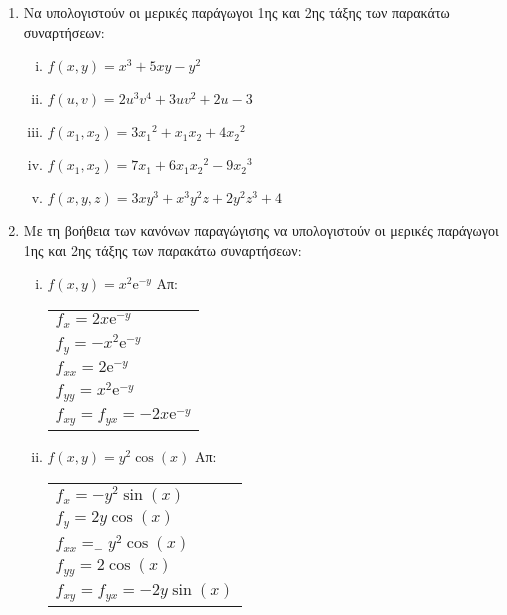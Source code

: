 \documentclass[a4paper,table]{report}
\begin{document}
\begin{center}
  \minibox{\large \bfseries \textcolor{Col1}{Ασκήσεις στις Μερικές Παραγώγους}}
\end{center}

\vspace{\baselineskip}


\begin{enumerate}
  \item Να υπολογιστούν οι μερικές παράγωγοι 1ης και 2ης  τάξης των παρακάτω συναρτήσεων:
    \begin{enumerate}[i)]
      \item $ f(x,y) = x^{3}+5xy - y^{2} $ 
      \item $ f(u,v) = 2u^{3}v^{4}+3uv^{2}+2u-3 $
      \item $ f(x_{1}, x_{2}) = 3 {x_{1}}^{2} + x_{1} x_{2} + 4 {x_{2}}^{2} $
      \item $ f(x_{1}, x_{2}) = 7 x_{1}+ 6 x_{1} {x_{2}}^{2} - 9 {x_{2}}^{3} $
      \item $ f(x,y,z) = 3xy^{3}+x^{3}y^{2}z+2y^{2}z^{3}+4 $
    \end{enumerate}


  \item Με τη βοήθεια των κανόνων παραγώγισης να υπολογιστούν οι μερικές 
    παράγωγοι 1ης και 2ης  τάξης των παρακάτω συναρτήσεων:

    \begin{enumerate}[i)]
      \item $ f(x,y) = x^{2} \mathrm{e}^{-y} $ \hfill Απ: \begin{tabular}{l}
          $ f_{x} = 2x \mathrm{e}^{-y} $ \\
          $ f_{y} = -x^{2} \mathrm{e}^{-y} $ \\
          $ f_{xx} = 2 \mathrm{e}^{-y} $ \\
          $ f_{yy} = x^{2} \mathrm{e}^{-y} $ \\
          $ f_{xy}=f_{yx} = -2x \mathrm{e}^{-y} $
        \end{tabular}

      \item $f(x,y)=y^2\cos (x)$ \hfill Απ: \begin{tabular}{l}
          $f_x=-y^2\sin(x)$ \\ 
          $f_y=2y\cos(x)$ \\
          $f_{xx}=_-y^2\cos(x)$ \\
          $f_{yy}=2\cos(x)$ \\
          $f_{xy} = f_{yx} =-2y\sin(x)$ 
        \end{tabular}


\end{enumerate}
\end{enumerate}
\end{document}
